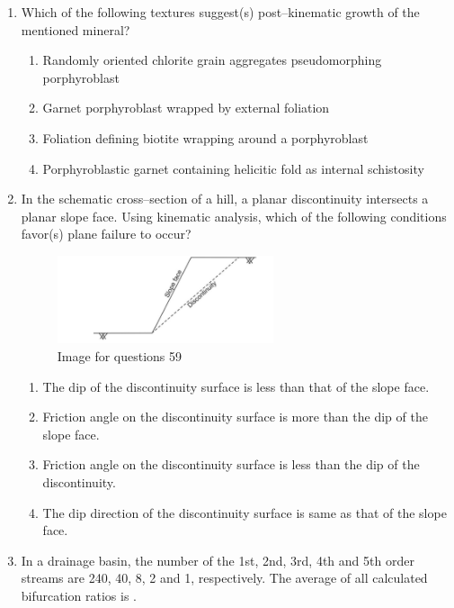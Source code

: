 \documentclass[journal,12pt,onecolumn]{IEEEtran}
\theoremstyle{remark}
\begin{document}
\begin{enumerate}
\item Which of the following textures suggest(s) post--kinematic growth of the mentioned mineral?
\begin{enumerate}
\item Randomly oriented chlorite grain aggregates pseudomorphing porphyroblast
\item Garnet porphyroblast wrapped by external foliation
\item Foliation defining biotite wrapping around a porphyroblast
\item Porphyroblastic garnet containing helicitic fold as internal schistosity
\end{enumerate}
\vspace{0.5cm}

\item In the schematic cross--section of a hill, a planar discontinuity intersects a planar slope face. Using kinematic analysis, which of the following conditions favor(s) plane failure to occur?

\begin{figure}[H]
    \centering
    \includegraphics[width=0.6\textwidth]{figs/fig9.png}
    \caption{Image for questions 59}
    \label{fig:question59}
\end{figure}
\vspace{0.5cm}




\begin{enumerate}
\item The dip of the discontinuity surface is less than that of the slope face.
\item Friction angle on the discontinuity surface is more than the dip of the slope face.
\item Friction angle on the discontinuity surface is less than the dip of the discontinuity.
\item The dip direction of the discontinuity surface is same as that of the slope face.
\end{enumerate}
\vspace{0.5cm}

\item In a drainage basin, the number of the 1st, 2nd, 3rd, 4th and 5th order streams are 240, 40, 8, 2 and 1, respectively. The average of all calculated bifurcation ratios is \underline{\hspace{10mm}}.  
\vspace{0.5cm}


\end{enumerate}
\end{document}

